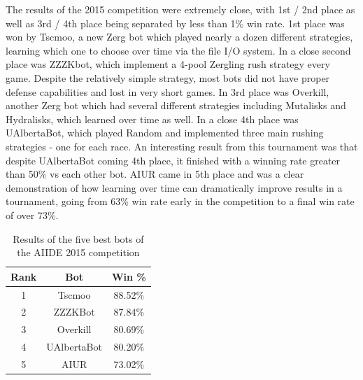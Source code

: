 \documentclass{llncs}
\begin{document}
The results of the 2015 competition were extremely close, with 1st / 2nd place as well as 3rd / 4th place being separated by less than 1\% win rate. 1st place was won by Tscmoo, a new Zerg bot which played nearly a dozen different strategies, learning which one to choose over time via the file I/O system. In a close second place was ZZZKbot, which implement a 4-pool Zergling rush strategy every game. Despite the relatively simple strategy, most bots did not have proper defense capabilities and lost in very short games. In 3rd place was Overkill, another Zerg bot which had several different strategies including Mutalisks and Hydralisks, which learned over time as well. In a close 4th place was UAlbertaBot, which played Random and implemented three main rushing strategies - one for each race. An interesting result from this tournament was that despite UAlbertaBot coming 4th place, it finished with a winning rate greater than 50\% vs each other bot. AIUR came in 5th place and was a clear demonstration of how learning over time can dramatically improve results in a tournament, going from 63\% win rate early in the competition to a final win rate of over 73\%.

\begin{table}[!t]
\caption{Results of the five best bots of the AIIDE 2015 competition}
\label{tab:aiide2015}
\centering
\begin{tabular}{|c|c|c|}
\hline
{\bfseries Rank} & {\bfseries Bot} & {\bfseries Win \%} \\
\hline
1 & Tscmoo & 88.52\% \\
2 & ZZZKBot & 87.84\% \\
3 & Overkill & 80.69\% \\
4 & UAlbertaBot & 80.20\% \\
5 & AIUR & 73.02\% \\
\hline
\end{tabular}
\end{table}

\end{document}

